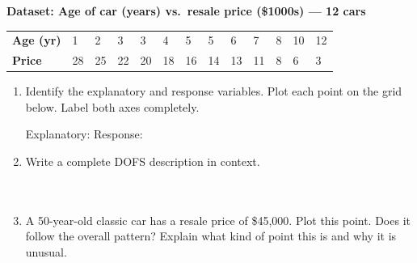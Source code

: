 \documentclass[10pt]{article}
\begin{document}
\vspace{0.12in}

\begin{tcolorbox}[colback=white, colframe=black!40, boxrule=0.8pt, arc=2mm,
    left=4mm, right=4mm, top=3mm, bottom=3mm,
    title={\textbf{Tier A --- Approaching Proficiency}}, fonttitle=\bfseries, halign title=center]
\small

\textbf{Dataset: Age of car (years) vs.\ resale price (\$1000s) --- 12 cars}

\vspace{6pt}
\renewcommand{\arraystretch}{1.4}
\begin{tabularx}{\linewidth}{@{} l *{12}{C{0.72cm}} @{}}
\textbf{Age (yr)} & 1 & 2 & 3 & 3 & 4 & 5 & 5 & 6 & 7 & 8 & 10 & 12 \\
\textbf{Price}    & 28 & 25 & 22 & 20 & 18 & 16 & 14 & 13 & 11 & 8 & 6 & 3 \\
\end{tabularx}

\vspace{10pt}

\begin{enumerate}[leftmargin=1.6em, itemsep=0.18in]

  \item Identify the explanatory and response variables. Plot each point on the grid below.
        Label both axes completely.

        Explanatory: \blank{4cm} \quad Response: \blank{4cm}

        \vspace{6pt}
        \begin{center}
        \end{center}

  \item Write a complete DOFS description in context.\\[8pt]
        \writeline\\[2pt]\writeline\\[2pt]\writeline

  \item A 50-year-old classic car has a resale price of \$45{,}000. Plot this point. Does it
        follow the overall pattern? Explain what kind of point this is and why it is unusual.\\[8pt]
        \writeline\\[2pt]\writeline\\[2pt]\writeline

\end{enumerate}
\end{tcolorbox}
\end{document}
